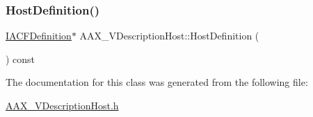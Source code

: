 \mbox{\label{a01909_ad1fe1d38840a467304d2adce856bd21e}} 
\subsubsection{\texorpdfstring{HostDefinition()}{HostDefinition()}}
{\footnotesize\ttfamily \mbox{\hyperlink{a01413}{I\+A\+C\+F\+Definition}}$\ast$ A\+A\+X\+\_\+\+V\+Description\+Host\+::\+Host\+Definition (\begin{DoxyParamCaption}{ }\end{DoxyParamCaption}) const\hspace{0.3cm}{\ttfamily [inline]}}



The documentation for this class was generated from the following file\+:\begin{DoxyCompactItemize}
\item 
\mbox{\hyperlink{a00701}{A\+A\+X\+\_\+\+V\+Description\+Host.\+h}}\end{DoxyCompactItemize}
